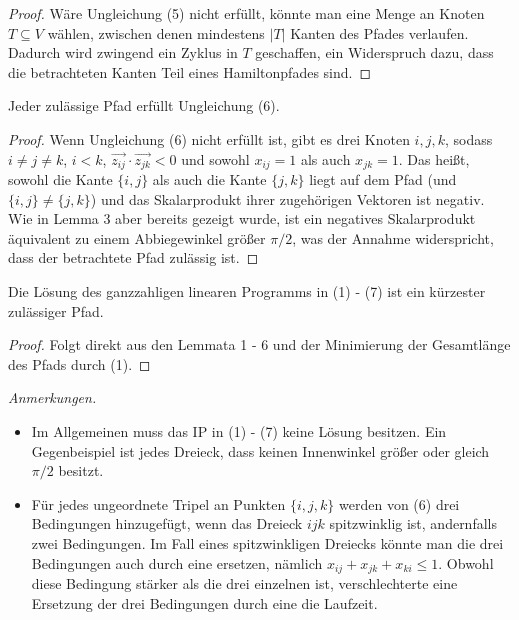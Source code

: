\documentclass[a4paper, 10pt, ngerman]{article}
\begin{document}
\begin{proof}
    Wäre Ungleichung (5) nicht erfüllt, könnte man eine Menge an Knoten $T \subseteq V$ wählen, zwischen denen mindestens $|T|$ Kanten des Pfades verlaufen. Dadurch wird zwingend ein Zyklus in $T$ geschaffen, ein Widerspruch dazu, dass die betrachteten Kanten Teil eines Hamiltonpfades sind.
\end{proof}

\begin{lemma}
    Jeder zulässige Pfad erfüllt Ungleichung (6).
\end{lemma}

\begin{proof}
    Wenn Ungleichung (6) nicht erfüllt ist, gibt es drei Knoten $i, j, k$, sodass $i \ne j \ne k$, $i < k$, $\vec{z_{ij}} \cdot \vec{z_{jk}} < 0$ und sowohl $x_{ij} = 1$ als auch $x_{jk} = 1$. Das heißt, sowohl die Kante $\{i, j\}$ als auch die Kante $\{j, k\}$ liegt auf dem Pfad (und $\{i, j\} \ne \{j, k\}$) und das Skalarprodukt ihrer zugehörigen Vektoren ist negativ. Wie in Lemma 3 aber bereits gezeigt wurde, ist ein negatives Skalarprodukt äquivalent zu einem Abbiegewinkel größer $\pi / 2$, was der Annahme widerspricht, dass der betrachtete Pfad zulässig ist.
\end{proof}

\begin{theorem}
    Die Lösung des ganzzahligen linearen Programms in (1) - (7) ist ein kürzester zulässiger Pfad. 
\end{theorem}

\begin{proof}
    Folgt direkt aus den Lemmata 1 - 6 und der Minimierung der Gesamtlänge des Pfads durch (1).
\end{proof}

\noindent \emph{Anmerkungen.} 
\begin{itemize}
    \item Im Allgemeinen muss das IP in (1) - (7) keine Lösung besitzen. Ein Gegenbeispiel ist jedes Dreieck, dass keinen Innenwinkel größer oder gleich $\pi / 2$ besitzt.
    \item Für jedes ungeordnete Tripel an Punkten $\{i, j, k\}$ werden von (6) drei Bedingungen hinzugefügt, wenn das Dreieck $ijk$ spitzwinklig ist, andernfalls zwei Bedingungen. Im Fall eines spitzwinkligen Dreiecks könnte man die drei Bedingungen auch durch eine ersetzen, nämlich $x_{ij} + x_{jk} + x_{ki} \le 1$. Obwohl diese Bedingung stärker als die drei einzelnen ist, verschlechterte eine Ersetzung der drei Bedingungen durch eine die Laufzeit.
\end{itemize} 
\end{document}

